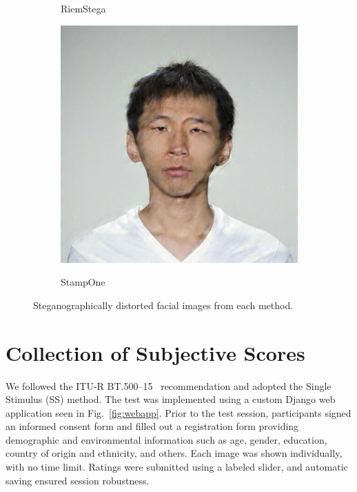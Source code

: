 \begin{figure}
\begin{subfigure}{0.23\textwidth}
        \caption{RiemStega}\label{fig:steganography_c}
    \end{subfigure}
    \hfill
    \begin{subfigure}{0.23\textwidth}
        \centering
        \includegraphics[width=\textwidth]{images/005_StampOne_1.4.jpg}\\
        \caption{StampOne}\label{fig:steganography_d}
    \end{subfigure}
    \caption{Steganographically distorted facial images from each method.}\label{fig:steganography}
\end{figure}

\section{Collection of Subjective Scores}

We followed the ITU-R BT.500--15~\cite{ITU-R-BT500} recommendation and adopted the Single Stimulus (SS) method. The test was implemented using a custom Django web application seen in Fig.~\ref{fig:webapp}. Prior to the test session, participants signed an informed consent form and filled out a registration form providing demographic and environmental information such as age, gender, education, country of origin and ethnicity, and others. Each image was shown individually, with no time limit. Ratings were submitted using a labeled slider, and automatic saving ensured session robustness.

